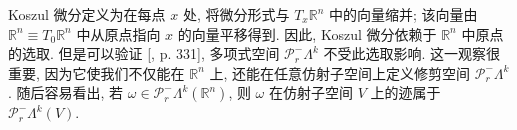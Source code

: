 \begin{Remark}\label{rem:trimmed-origin-independence}
Koszul 微分定义为在每点 $x$ 处, 将微分形式与 $T_x\mathbb R^n$ 中的向量缩并; 该向量由 $\mathbb R^n\equiv T_0\mathbb R^n$ 中从原点指向 $x$ 的向量平移得到. 因此, Koszul 微分依赖于 $\mathbb R^n$ 中原点的选取. 但是可以验证 [, p. 331], 多项式空间 $\mathcal P_r^-\Lambda^k$ 不受此选取影响. 这一观察很重要, 因为它使我们不仅能在 $\mathbb R^n$ 上, 还能在任意仿射子空间上定义修剪空间 $\mathcal P_r^-\Lambda^k$. 随后容易看出, 若 $\omega\in\mathcal P_r^-\Lambda^k(\mathbb R^n)$, 则 $\omega$ 在仿射子空间 $V$ 上的迹属于 $\mathcal P_r^-\Lambda^k(V)$.
\end{Remark}
